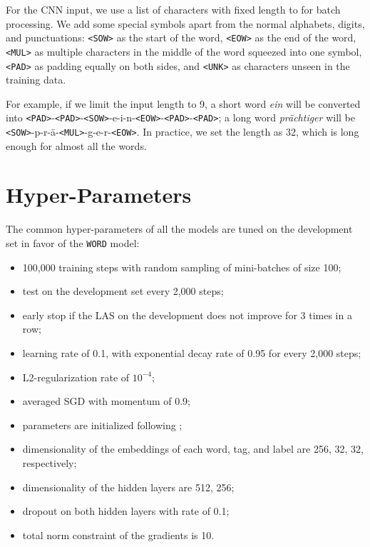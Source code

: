 \documentclass[11pt,a4paper]{article}
\begin{document}
  For the CNN input, we use a list of characters with fixed length to for batch processing.
  We add some special symbols apart from the normal alphabets, digits, and punctuations: \texttt{<SOW>} as the start of the word, \texttt{<EOW>} as the end of the word, \texttt{<MUL>} as multiple characters in the middle of the word squeezed into one symbol, \texttt{<PAD>} as padding equally on both sides, and \texttt{<UNK>} as characters unseen in the training data.

  For example, if we limit the input length to 9, a short word {\em ein} will be converted into \texttt{<PAD>}-\texttt{<PAD>}-\texttt{<SOW>}-e-i-n-\texttt{<EOW>}-\texttt{<PAD>}-\texttt{<PAD>}; a long word {\em pr\"achtiger} will be \texttt{<SOW>}-p-r-\"a-\texttt{<MUL>}-g-e-r-\texttt{<EOW>}. In practice, we set the length as 32, which is long enough for almost all the words. 



\section{Hyper-Parameters}\label{sec:hyper}
  The common hyper-parameters of all the models are tuned on the development set in favor of the \texttt{WORD} model:
  \begin{itemize}[leftmargin=*]
    \item 100,000 training steps with random sampling of mini-batches of size 100;
    \item test on the development set every 2,000 steps;
    \item early stop if the LAS on the development does not improve for 3 times in a row;
    \item learning rate of 0.1, with exponential decay rate of 0.95 for every 2,000 steps;
    \item L2-regularization rate of $10^{-4}$;
    \item averaged SGD with momentum of 0.9;
    \item parameters are initialized following \citet{He:2015};
    \item dimensionality of the embeddings of each word, tag, and label are 256, 32, 32, respectively;
    \item dimensionality of the hidden layers are 512, 256;
    \item dropout on both hidden layers with rate of 0.1;
    \item total norm constraint of the gradients is 10.
  \end{itemize}
\end{document}
